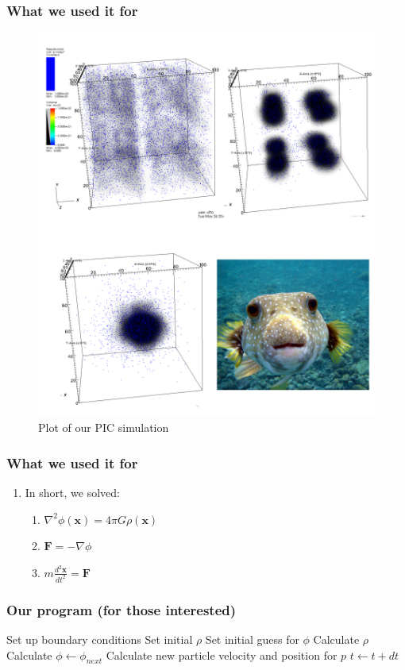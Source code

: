 \documentclass{beamer}
\begin{document}
\begin{frame}[fragile]
 \frametitle{What we used it for}
 \begin{figure}
  \centering
  \includegraphics[height=0.7\textheight]{PICcombined.png}
  \caption{\tiny{Plot of our PIC simulation}}
 \end{figure}
\end{frame}

\begin{frame}
 \frametitle{What we used it for}
 \begin{enumerate}
  \item In short, we solved:
  \begin{enumerate}
   \item $\nabla^2 \phi(\mathbf{x}) = 4\pi G \rho(\mathbf{x})$
   \item $\mathbf{F} = -\nabla \phi$
   \item $m \frac{d^2\mathbf{x}}{dt^2} = \mathbf{F}$
  \end{enumerate}
 \end{enumerate}
\end{frame}

\begin{frame}[fragile]
  \frametitle{Our program (for those interested)}
  \begin{algorithmic}
   \State Set up boundary conditions
   \State Set initial $\rho$
   \State Set initial guess for $\phi$
   \Loop
    \State Calculate $\rho$
    \State Calculate $\phi \gets \phi_{next}$
     \State Calculate new particle velocity and position for $p$
    \EndFor
    \State $t \gets t+dt$
   \EndLoop
  \end{algorithmic}
\end{frame}
\end{document}
